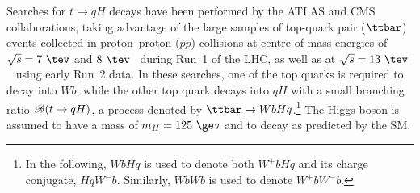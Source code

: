 Searches for $t \to qH$ decays have been performed by the ATLAS and CMS collaborations, taking advantage of the large samples
of top-quark pair ($\ttbar$) events collected in proton--proton ($pp$) collisions at centre-of-mass energies of $\sqrt{s}=7~\tev$ and $8~\tev$~\cite{Aad:2014dya,Aad:2015pja,Khachatryan:2016atv} during Run~1 of the LHC, as well as at $\sqrt{s}=13~\tev$~\cite{fcnc36} using early Run~2 data.
In these searches, one of the top quarks is required to decay into $Wb$, while the other top quark decays into $qH$ with a small branching ratio 
 $\mathscr{B}(t\to qH)$, a process denoted by $\ttbar \to WbHq$.\footnote{In the following, $WbHq$ is used to denote both $W^+b H\bar{q}$ and its charge conjugate, $HqW^- \bar{b}$. Similarly, 
$WbWb$ is used to denote $W^+b W^- \bar{b}$.}  The Higgs boson is assumed to have a mass of $m_H=125~\gev$ and to decay as predicted by
the SM.

